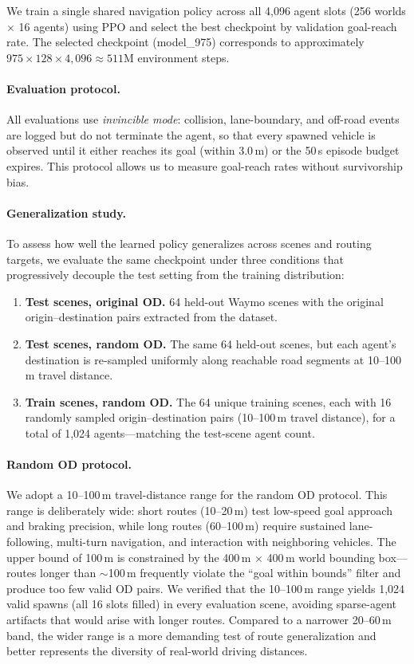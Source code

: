 We train a single shared navigation policy across all 4{,}096 agent slots (256 worlds $\times$ 16 agents) using PPO and select the best checkpoint by validation goal-reach rate.
The selected checkpoint (model\_975) corresponds to approximately $975 \times 128 \times 4{,}096 \approx 511\text{M}$ environment steps.

\paragraph{Evaluation protocol.}
All evaluations use \emph{invincible mode}: collision, lane-boundary, and off-road events are logged but do not terminate the agent, so that every spawned vehicle is observed until it either reaches its goal (within 3.0\,m) or the 50\,s episode budget expires.
This protocol allows us to measure goal-reach rates without survivorship bias.

\paragraph{Generalization study.}
To assess how well the learned policy generalizes across scenes and routing targets, we evaluate the same checkpoint under three conditions that progressively decouple the test setting from the training distribution:
%
\begin{enumerate}[leftmargin=*, itemsep=1pt]
  \item \textbf{Test scenes, original OD.}
        64 held-out Waymo scenes with the original origin--destination pairs extracted from the dataset.
  \item \textbf{Test scenes, random OD.}
        The same 64 held-out scenes, but each agent's destination is re-sampled uniformly along reachable road segments at 10--100\,m travel distance.
  \item \textbf{Train scenes, random OD.}
        The 64 unique training scenes, each with 16 randomly sampled origin--destination pairs (10--100\,m travel distance), for a total of 1{,}024 agents---matching the test-scene agent count.
\end{enumerate}

\paragraph{Random OD protocol.}
We adopt a 10--100\,m travel-distance range for the random OD protocol.
This range is deliberately wide: short routes (10--20\,m) test low-speed goal approach and braking precision, while long routes (60--100\,m) require sustained lane-following, multi-turn navigation, and interaction with neighboring vehicles.
The upper bound of 100\,m is constrained by the 400\,m $\times$ 400\,m world bounding box---routes longer than $\sim$100\,m frequently violate the ``goal within bounds'' filter and produce too few valid OD pairs.
We verified that the 10--100\,m range yields 1{,}024 valid spawns (all 16 slots filled) in every evaluation scene, avoiding sparse-agent artifacts that would arise with longer routes.
Compared to a narrower 20--60\,m band, the wider range is a more demanding test of route generalization and better represents the diversity of real-world driving distances.

